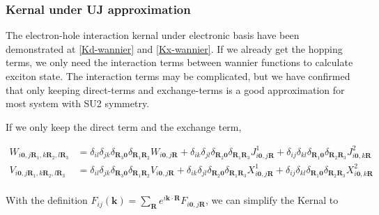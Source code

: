 \subsubsection{Kernal under UJ approximation}

The electron-hole interaction kernal under electronic basis have been demonstrated at \cref{Kd-wannier} and \cref{Kx-wannier}.
If we already get the hopping terms, we only need the interaction terms between wannier functions to calculate exciton state.
The interaction terms may be complicated, 
but we have confirmed that only keeping direct-terms and exchange-terms is a good approximation for most system with SU2 symmetry.

If we only keep the direct term and the exchange term, 

\begin{equation}
  \begin{aligned}
    W_{i\boldsymbol{0},j\boldsymbol{R}_1,k\boldsymbol{R}_2,l\boldsymbol{R}_3}
    &= \delta_{il}\delta_{jk}\delta_{\boldsymbol{R}_3\boldsymbol{0}}\delta_{\boldsymbol{R}_1\boldsymbol{R}_2} 
      W_{i\boldsymbol{0},j\boldsymbol{R}}
      +\delta_{ik}\delta_{jl}\delta_{\boldsymbol{R}_2\boldsymbol{0}}\delta_{\boldsymbol{R}_1\boldsymbol{R}_3} 
      J^{1}_{i\boldsymbol{0},j\boldsymbol{R}}
      +\delta_{ij}\delta_{kl}\delta_{\boldsymbol{R}_1\boldsymbol{0}}\delta_{\boldsymbol{R}_2\boldsymbol{R}_3} 
      J^{2}_{i\boldsymbol{0},k\boldsymbol{R}} \\
    V_{i\boldsymbol{0},j\boldsymbol{R}_1,k\boldsymbol{R}_2,l\boldsymbol{R}_3}
    &= \delta_{il}\delta_{jk}\delta_{\boldsymbol{R}_3\boldsymbol{0}}\delta_{\boldsymbol{R}_1\boldsymbol{R}_2} 
      V_{i\boldsymbol{0},j\boldsymbol{R}}
      +\delta_{ik}\delta_{jl}\delta_{\boldsymbol{R}_2\boldsymbol{0}}\delta_{\boldsymbol{R}_1\boldsymbol{R}_3} 
      X^{1}_{i\boldsymbol{0},j\boldsymbol{R}}
      +\delta_{ij}\delta_{kl}\delta_{\boldsymbol{R}_1\boldsymbol{0}}\delta_{\boldsymbol{R}_2\boldsymbol{R}_3} 
      X^{2}_{i\boldsymbol{0},k\boldsymbol{R}} \\
  \end{aligned}
\end{equation}

\noindent
With the definition $F_{ij}(\boldsymbol{k}) = \sum_{\boldsymbol{R}} e^{i\boldsymbol{k}\cdot\boldsymbol{R}} F_{i\boldsymbol{0},j\boldsymbol{R}}$,
we can simplify the Kernal to


